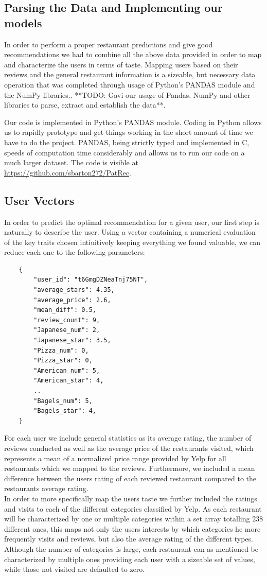 \documentclass[10pt,twocolumn,letterpaper]{article}
\begin{document}
\subsection{Parsing the Data and Implementing our models}
In order to perform a proper restaurant predictions and give good recommendations we had to combine all the above data provided in order to map and characterize the users in terms of taste. Mapping users based on their reviews and the general restaurant information is a sizeable, but necessary data operation that was completed through usage of Python's PANDAS module and the NumPy libraries.. **TODO: Gavi our usage of Pandas, NumPy and other libraries to parse, extract and establish the data**.

Our code is implemented in Python's PANDAS module. Coding in Python allows us to rapidly prototype and get things working in the short amount of time we have to do the project. PANDAS, being strictly typed and implemented in C, speeds of computation time considerably and allows us to run our code on a much larger dataset. The code is visible at \url{https://github.com/sbarton272/PatRec}.

\subsection{User Vectors}
In order to predict the optimal recommendation for a given user, our first step is naturally to describe the user. Using a vector containing a numerical evaluation of the key traits chosen intiuitively keeping everything we found valuable, we can reduce each one to the following parameters:
\begin{verbatim}
	{
	    "user_id": "t6GmgDZNeaTnj75NT",
	    "average_stars": 4.35,
	    "average_price": 2.6,
	   	"mean_diff": 0.5,
	   	"review_count": 9,
	   	"Japanese_num": 2,
	   	"Japanese_star": 3.5,
	   	"Pizza_num": 0,
	   	"Pizza_star": 0,
	   	"American_num": 5,
	   	"American_star": 4,
	   	..
	   	"Bagels_num": 5,
	   	"Bagels_star": 4,
	}
\end{verbatim}

For each user we include general statistics as its average rating, the number of reviews conducted as well as the average price of the restaurants visited, which represents a mean of a normalized price range provided by Yelp for all restaurants which we mapped to the reviews. Furthermore, we included a mean difference between the users rating of each reviewed restaurant compared to the restaurants average rating. 
\\[.5em]
\indent In order to more specifically map the users taste we further included the ratings and visits to each of the different categories classified by Yelp. As each restaurant will be characterized by one or multiple categories within a set array totalling 238 different ones, this maps not only the users interests by which categories he more frequently visits and reviews, but also the average rating of the different types. Although the number of categories is large, each restaurant can as mentioned be characterized by multiple ones providing each user with a sizeable set of values, while those not visited are defaulted to zero.
\end{document}
